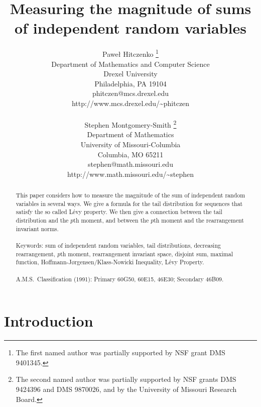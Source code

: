 \documentclass[12pt]{article}
\begin{document}
\title{Measuring the magnitude of sums\\
of independent random variables}

\author{%
Pawe{\l} Hitczenko%
\thanks{The first named author was partially supported 
by NSF grant DMS 9401345.}\\
Department of Mathematics and Computer Science\\
Drexel University\\
Philadelphia, PA 19104\\
phitczen@mcs.drexel.edu\\
http://www.mcs.drexel.edu/\~{}phitczen\\
\\
Stephen Montgomery-Smith%
\thanks{The second named author was 
partially supported
by NSF grants DMS 9424396 and DMS 9870026, and by the
University of Missouri Research Board.}\\
Department of Mathematics\\
University of Missouri-Columbia\\
Columbia, MO 65211\\
stephen@math.missouri.edu\\
http://www.math.missouri.edu/\~{}stephen}

\date{}

\maketitle

\begin{abstract}
\noindent
This paper considers how to measure the magnitude of the sum of 
independent random variables in several ways.
We give a formula for the tail distribution for
sequences that satisfy the so called L\'evy property.
We then give a connection between the tail distribution and the
$p$th moment, and between the $p$th moment and
the rearrangement invariant norms.
\\
\\
Keywords: sum of independent random variables, 
tail distributions, decreasing rearrangement, 
$p$th moment, rearrangement invariant space,
disjoint sum, maximal function,
Hoffmann-J{\o}rgensen/Klass-Nowicki Inequality,
L\'evy Property.
\\
\\
A.M.S.\ Classification (1991): Primary 60G50, 60E15, 46E30; 
Secondary 46B09. 

\end{abstract}

\section{Introduction}
\label{intro}
\end{document}
